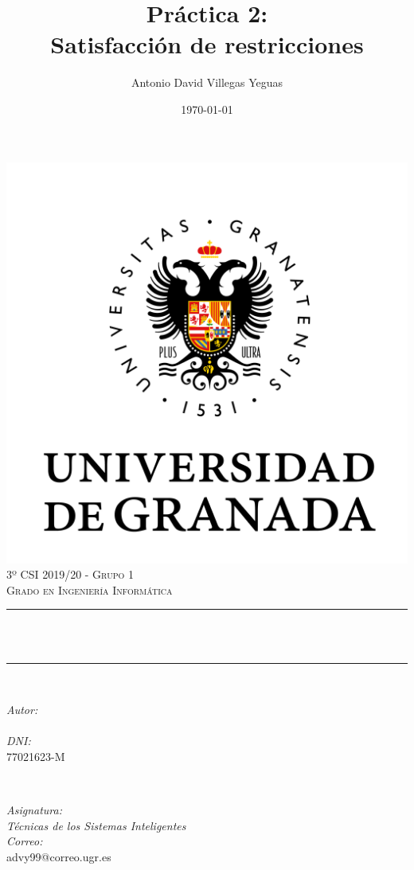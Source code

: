 \documentclass[11pt, spanish]{article}
\title{Práctica 2:\\
Satisfacción de restricciones  \hspace{0.05cm} }
\author{Antonio David Villegas Yeguas}
\date{\today}
\makeatletter
\let\thetitle\@title
\let\theauthor\@author
\makeatother
\begin{document}

\begin{titlepage}
    \centering
    \vspace*{0.3 cm}
    \includegraphics[scale = 0.50]{ugr.png}\\[0.7 cm]
    \textsc{\large 3º CSI 2019/20 - Grupo 1}\\[0.5 cm]            
    \textsc{\large Grado en Ingeniería Informática}\\[0.5 cm]              
    \rule{\linewidth}{0.2 mm} \\[0.2 cm]
    { \huge \bfseries \thetitle}\\
    \rule{\linewidth}{0.2 mm} \\[1 cm]
    
    \begin{minipage}{0.4\textwidth}
        \begin{flushleft} \large
            \emph{Autor:}\\
            \theauthor\\ 
			 \emph{DNI:}\\
            77021623-M
            \end{flushleft}
            \end{minipage}~
            \begin{minipage}{0.4\textwidth}
            \begin{flushright} \large
            \emph{Asignatura: \\
            Técnicas de los Sistemas Inteligentes}   \\     
            \emph{Correo:}\\
            advy99@correo.ugr.es           
        \end{flushright}
    \end{minipage}\\[0.5cm]
  

\end{titlepage}
\end{document}
